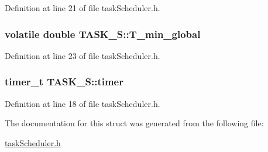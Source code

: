 Definition at line 21 of file task\-Scheduler.\-h.

\hypertarget{structTASK__S_a07174e333a0013f4d51b30509b388f58}{
\subsubsection[{T\-\_\-min\-\_\-global}]{\setlength{\rightskip}{0pt plus 5cm}volatile double T\-A\-S\-K\-\_\-\-S\-::\-T\-\_\-min\-\_\-global}}\label{structTASK__S_a07174e333a0013f4d51b30509b388f58}


Definition at line 23 of file task\-Scheduler.\-h.

\hypertarget{structTASK__S_a17834f3d4f84241ccb4191f3cf7d7af3}{
\subsubsection[{timer}]{\setlength{\rightskip}{0pt plus 5cm}timer\-\_\-t T\-A\-S\-K\-\_\-\-S\-::timer}}\label{structTASK__S_a17834f3d4f84241ccb4191f3cf7d7af3}


Definition at line 18 of file task\-Scheduler.\-h.



The documentation for this struct was generated from the following file\-:\begin{DoxyCompactItemize}
\item 
\hyperlink{taskScheduler_8h}{task\-Scheduler.\-h}\end{DoxyCompactItemize}
